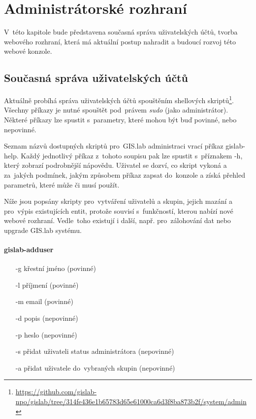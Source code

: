 \chapter{Administrátorské rozhraní}
\label{4-praxe}

V~této kapitole bude představena současná správa uživatelských účtů, tvorba webového rozhraní, která má aktuální postup nahradit a budoucí rozvoj této webové konzole.

\section{Současná správa uživatelských účtů}
\label{cmd-line}

Aktuálně probíhá správa uživatelských účtů spouštěním shellových
skriptů\footnote{\href{https://github.com/gislab-npo/gislab/tree/314fe436e1b65783d65e61000ca6d3f8ba873b2f/system/admin}{https://github.com/gislab-npo/gislab/tree/314fe436e1b65783d65e61000ca6d3f8ba873b2f/system/admin}}. \linebreak Všechny příkazy je nutné spouštět pod~právem
\textit{sudo} (jako administrátor). Některé příkazy lze spustit 
s~parametry, které mohou být buď povinné, nebo nepovinné.

Seznam názvů dostupných skriptů pro~GIS.lab administraci vrací příkaz
\textsf{gislab-help}. Každý jednotlivý příkaz z~tohoto soupisu pak lze
spustit s~příznakem \textsf{-h}, který zobrazí podrobnější
nápovědu. Uživatel se dozví, co skript vykoná a za~jakých podmínek,
jakým způsobem příkaz zapsat do~konzole a získá přehled parametrů,
které může či musí použít.

Níže jsou popsány skripty pro~vytváření uživatelů a skupin, jejich
mazání a pro~výpis existujících entit, protože souvisí s~funkčností,
kterou nabízí nové webové rozhraní. Vedle~toho existují i další,
např. pro~zálohování dat nebo upgrade GIS.lab systému.

\subsubsection{gislab-adduser}
\begin{itemize}
\item [-g] křestní jméno (povinné)
\item [-l] příjmení (povinné)
\item [-m] email (povinné)
\item [-d] popis (nepovinné)
\item [-p] heslo (nepovinné)
\item [-s] přidat uživateli status administrátora (nepovinné)
\item [-a] přidat uživatele do~vybraných skupin (nepovinné)
\end{itemize}

